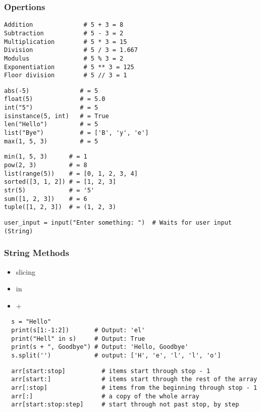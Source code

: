 \documentclass[11pt]{article}
\begin{document}
\subsubsection{Opertions}
\vspace{-0.6cm}
\begin{multicols}{2}
\begin{lstlisting}
Addition              # 5 + 3 = 8
Subtraction           # 5 - 3 = 2
Multiplication        # 5 * 3 = 15
Division              # 5 / 3 = 1.667
Modulus               # 5 % 3 = 2
Exponentiation        # 5 ** 3 = 125
Floor division        # 5 // 3 = 1
\end{lstlisting}
\vspace{-0.7cm}

\begin{multicols}{2}
\begin{lstlisting}
abs(-5)              # = 5
float(5)             # = 5.0
int("5")             # = 5
isinstance(5, int)   # = True
len("Hello")         # = 5
list("Bye")          # = ['B', 'y', 'e']
max(1, 5, 3)         # = 5
\end{lstlisting}
\begin{lstlisting}
min(1, 5, 3)      # = 1
pow(2, 3)         # = 8
list(range(5))    # = [0, 1, 2, 3, 4]
sorted([3, 1, 2]) # = [1, 2, 3]
str(5)            # = '5'
sum([1, 2, 3])    # = 6
tuple([1, 2, 3])  # = (1, 2, 3)
\end{lstlisting}
\end{multicols}
\vspace{-0.8cm}
\begin{lstlisting}
user_input = input("Enter something: ")  # Waits for user input (String)
\end{lstlisting}

\subsubsection{String Methods}
\vspace{-0.6cm}
\begin{multicols}{4}
  \begin{itemize}
      \item slicing
      \item in
      \item +
  \end{itemize}
\end{multicols}
\vspace{-0.4cm}
\begin{lstlisting}
  s = "Hello"
  print(s[1:-1:2])       # Output: 'el'
  print("Hell" in s)     # Output: True
  print(s + ", Goodbye") # Output: 'Hello, Goodbye'
  s.split('')            # output: ['H', 'e', 'l', 'l', 'o']
\end{lstlisting}
\vspace{-0.1cm}
\begin{lstlisting}
  arr[start:stop]          # items start through stop - 1
  arr[start:]              # items start through the rest of the array
  arr[:stop]               # items from the beginning through stop - 1
  arr[:]                   # a copy of the whole array
  arr[start:stop:step]     # start through not past stop, by step
\end{lstlisting}


\end{multicols}
\end{document}
